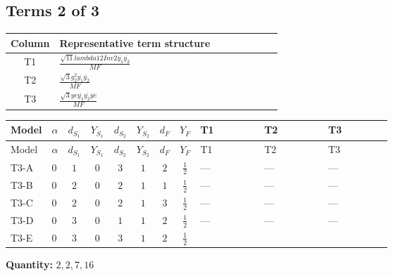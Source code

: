\documentclass[8pt]{article}
\begin{document}
\begin{landscape}
\subsection*{Terms 2 of 3}
\begin{center}
\begin{tabular}{@{}c >{\raggedright\arraybackslash}p{0.82\linewidth}@{}}
\toprule
Column & Representative term structure \\
\midrule
T1 & \(\displaystyle \frac{\sqrt{11} lambda12Inv2 \overline{y_{1}} \overline{y_{2}}}{MF}\) \\
\midrule
T2 & \(\displaystyle \frac{\sqrt{3} g_{2}^{2} \overline{y_{1}} \overline{y_{2}}}{MF}\) \\
\midrule
T3 & \(\displaystyle \frac{\sqrt{3} ye \overline{y_{1}} \overline{y_{2}} \overline{ye}}{MF}\) \\
\midrule
\bottomrule
\end{tabular}
\end{center}
\smallskip
\tiny
\begin{longtable}{@{}llcccccc >{\raggedright\arraybackslash}p{0.21\linewidth} >{\raggedright\arraybackslash}p{0.21\linewidth} >{\raggedright\arraybackslash}p{0.21\linewidth}@{}}
\toprule
Model & $\alpha$ & $d_{S_1}$ & $Y_{S_1}$ & $d_{S_2}$ & $Y_{S_2}$ & $d_F$ & $Y_F$ & T1 & T2 & T3 \\
\midrule
\endfirsthead
\toprule
Model & $\alpha$ & $d_{S_1}$ & $Y_{S_1}$ & $d_{S_2}$ & $Y_{S_2}$ & $d_F$ & $Y_F$ & T1 & T2 & T3 \\
\midrule
\endhead
T3-A & $0$ & $1$ & $0$ & $3$ & $1$ & $2$ & $\frac{1}{2}$ & --- & --- & --- \\
\midrule
T3-B & $0$ & $2$ & $0$ & $2$ & $1$ & $1$ & $\frac{1}{2}$ & --- & --- & --- \\
\midrule
T3-C & $0$ & $2$ & $0$ & $2$ & $1$ & $3$ & $\frac{1}{2}$ & --- & --- & --- \\
\midrule
T3-D & $0$ & $3$ & $0$ & $1$ & $1$ & $2$ & $\frac{1}{2}$ & --- & --- & --- \\
\midrule
T3-E & $0$ & $3$ & $0$ & $3$ & $1$ & $2$ & $\frac{1}{2}$ & \scriptsize\adjustbox{max width=\linewidth}{$\begin{gathered} \frac{3 \sqrt{11} lambda12Inv2 \overline{y_{1}} \overline{y_{2}}}{22 MF}\end{gathered}$} & \scriptsize\adjustbox{max width=\linewidth}{$\begin{gathered} \frac{49 \sqrt{3} g_{2}^{2} \overline{y_{1}} \overline{y_{2}}}{24 MF}\end{gathered}$} & \scriptsize\adjustbox{max width=\linewidth}{$\begin{gathered} - \frac{\sqrt{3} ye \overline{y_{1}} \overline{y_{2}} \overline{ye}}{12 MF}\end{gathered}$} \\
\midrule
\bottomrule
\end{longtable}
\clearpage
\noindent\textbf{Quantity: }$\mathrm{2,2,7,16}$\par\smallskip

\end{landscape}
\end{document}
